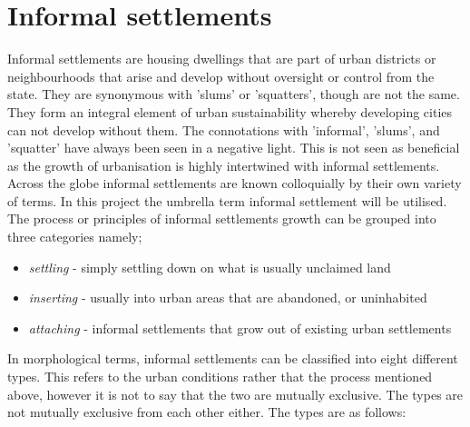 \section{Informal settlements}
Informal settlements are housing dwellings that are part of urban districts or neighbourhoods that arise and develop without oversight or control from the state. They are synonymous with 'slums' or 'squatters', though are not the same. They form an integral element of urban sustainability whereby developing cities can not develop without them. The connotations with 'informal', 'slums', and 'squatter' have always been seen in a negative light. This is not seen as beneficial as the growth of urbanisation is highly intertwined with informal settlements.\citep{dovey2011forms}\\
Across the globe informal settlements are known colloquially by their own variety of terms. \citep{un} In this project the umbrella term informal settlement will be utilised.\\
The process or principles of informal settlements growth can be grouped into three categories namely;\citep{dovey2011forms}
\begin{itemize}
\item \textsl{settling} - simply settling down on what is usually unclaimed land
\item \textsl{inserting} - usually into urban areas that are abandoned, or uninhabited
\item \textsl{attaching} - informal settlements that grow out of existing urban settlements
\end{itemize}
In morphological terms, informal settlements can be classified into eight different types. This refers to the urban conditions rather that the process mentioned above, however it is not to say that the two are mutually exclusive. The types are not mutually exclusive from each other either. The types are as follows:\citep{dovey2011forms}
